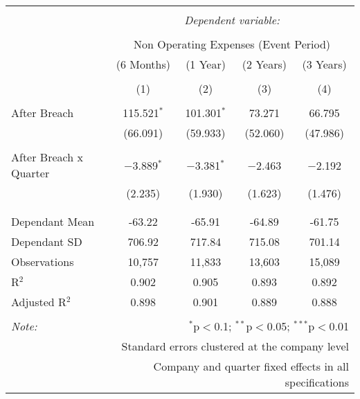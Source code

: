 
\begin{table}[!htbp] \centering 
  \caption{} 
  \label{} 
\begin{tabular}{@{\extracolsep{5pt}}lcccc} 
\\[-1.8ex]\hline 
\hline \\[-1.8ex] 
 & \multicolumn{4}{c}{\textit{Dependent variable:}} \\ 
\cline{2-5} 
\\[-1.8ex] & \multicolumn{4}{c}{Non Operating Expenses (Event Period)} \\ 
 & (6 Months) & (1 Year) & (2 Years) & (3 Years) \\ 
\\[-1.8ex] & (1) & (2) & (3) & (4)\\ 
\hline \\[-1.8ex] 
 After Breach & 115.521$^{*}$ & 101.301$^{*}$ & 73.271 & 66.795 \\ 
  & (66.091) & (59.933) & (52.060) & (47.986) \\ 
  & & & & \\ 
 After Breach x Quarter & $-$3.889$^{*}$ & $-$3.381$^{*}$ & $-$2.463 & $-$2.192 \\ 
  & (2.235) & (1.930) & (1.623) & (1.476) \\ 
  & & & & \\ 
\hline \\[-1.8ex] 
Dependant Mean & -63.22 & -65.91 & -64.89 & -61.75 \\ 
Dependant SD & 706.92 & 717.84 & 715.08 & 701.14 \\ 
Observations & 10,757 & 11,833 & 13,603 & 15,089 \\ 
R$^{2}$ & 0.902 & 0.905 & 0.893 & 0.892 \\ 
Adjusted R$^{2}$ & 0.898 & 0.901 & 0.889 & 0.888 \\ 
\hline 
\hline \\[-1.8ex] 
\textit{Note:}  & \multicolumn{4}{r}{$^{*}$p$<$0.1; $^{**}$p$<$0.05; $^{***}$p$<$0.01} \\ 
 & \multicolumn{4}{r}{Standard errors clustered at the company level} \\ 
 & \multicolumn{4}{r}{Company and quarter fixed effects in all specifications} \\ 
\end{tabular} 
\end{table} 

